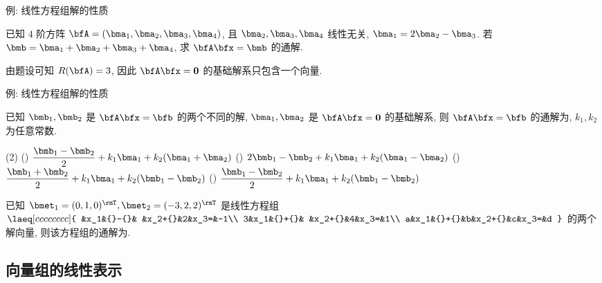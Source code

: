 \begin{frame}{例: 线性方程组解的性质}
	\onslide<+->
	\begin{example}
		已知 $4$ 阶方阵 $\bfA=(\bma_1,\bma_2,\bma_3,\bma_4)$, 且 $\bma_2,\bma_3,\bma_4$ 线性无关, $\bma_1=2\bma_2-\bma_3$.
		若 $\bmb=\bma_1+\bma_2+\bma_3+\bma_4$, 求 $\bfA\bfx=\bmb$ 的通解.
	\end{example}
	\onslide<+->
	\begin{solution}
		由题设可知 $R(\bfA)=3$, 因此 $\bfA\bfx={\bf0}$ 的基础解系只包含一个向量.
		\vspace{-\baselineskip}
	\end{solution}
\end{frame}


\begin{frame}{例: 线性方程组解的性质}
	\onslide<+->
	\begin{example}
		已知 $\bmb_1,\bmb_2$ 是 $\bfA\bfx=\bfb$ 的两个不同的解, $\bma_1,\bma_2$ 是 $\bfA\bfx={\bf0}$ 的基础解系, 则 $\bfA\bfx=\bfb$ 的通解为, $k_1,k_2$ 为任意常数.
		\begin{taskschoice}(2)
			() $\dfrac{\bmb_1-\bmb_2}2+k_1\bma_1+k_2(\bma_1+\bma_2)$
			() $2\bmb_1-\bmb_2+k_1\bma_1+k_2(\bma_1-\bma_2)$
			() $\dfrac{\bmb_1+\bmb_2}2+k_1\bma_1+k_2(\bmb_1-\bmb_2)$
			() $\dfrac{\bmb_1-\bmb_2}2+k_1\bma_1+k_2(\bmb_1-\bmb_2)$
		\end{taskschoice}
	\end{example}
	\onslide<+->
	\begin{exercise}
		已知 $\bmet_1=(0,1,0)^\rmT,\bmet_2=(-3,2,2)^\rmT$ 是线性方程组 $\laeq[cccccccc]{
			 &x_1&{}-{}& &x_2+{}&2&x_3=&-1\\
			3&x_1&{}+{}& &x_2+{}&4&x_3=&1\\
			a&x_1&{}+{}&b&x_2+{}&c&x_3=&d
		}$ 的两个解向量, 则该方程组的通解为.
	\end{exercise}
\end{frame}


\subsection{向量组的线性表示}

